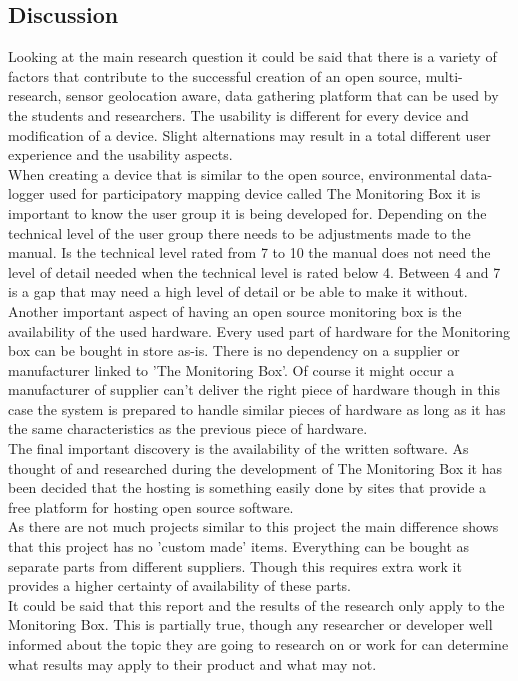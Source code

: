 \documentclass[conference]{IEEEtran}
\begin{document}
\begin{figure*}[ht]
\begin{enumerate}
\begin{enumerate}
\begin{figure*}[!ht]
\section{Discussion}
	Looking at the main research question it could be said that there is a variety of factors that contribute to the successful creation of an open source, multi-research, sensor geolocation aware, data gathering platform that can be used by the students and researchers. The usability is different for every device and modification of a device. Slight alternations may result in a total different user experience and the usability aspects. \\
	When creating a device that is similar to the open source, environmental data-logger used for participatory mapping device called The Monitoring Box it is important to know the user group it is being developed for. Depending on the technical level of the user group there needs to be adjustments made to the manual. Is the technical level rated from 7 to 10 the manual does not need the level of detail needed when the technical level is rated below 4. Between 4 and 7 is a gap that may need a high level of detail or be able to make it without.\\
	Another important aspect of having an open source monitoring box is the availability of the used hardware. Every used part of hardware for the Monitoring box can be bought in store as-is. There is no dependency on a supplier or manufacturer linked to 'The Monitoring Box'. Of course it might occur a manufacturer of supplier can't deliver the right piece of hardware though in this case the system is prepared to handle similar pieces of hardware as long as it has the same characteristics as the previous piece of hardware. \\
	The final important discovery is the availability of the written software. As thought of and researched during the development of The Monitoring Box it has been decided that the hosting is something easily done by sites that provide a free platform for hosting open source software.\\	
	As there are not much projects similar to this project the main difference shows that this project has no 'custom made' items. Everything can be bought as separate parts from different suppliers. Though this requires extra work it provides a higher certainty of availability of these parts. \\
	It could be said that this report and the results of the research only apply to the Monitoring Box. This is partially true, though any researcher or developer well informed about the topic they are going to research on or work for can determine what results may apply to their product and what may not.


\end{figure*}
\end{enumerate}
\end{enumerate}
\end{figure*}
\end{document}
